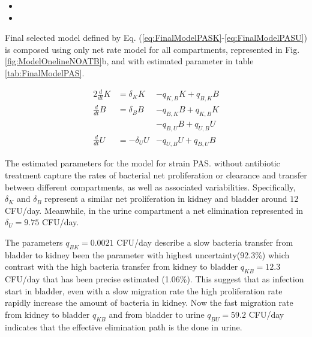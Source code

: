 \documentclass{article}
\begin{document}
\begin{itemize}
	\item {}
	\item {}
\end{itemize}

Final selected model defined by Eq. (\ref{eq:FinalModelPASK}-\ref{eq:FinalModelPASU}) is composed using only net rate model for all compartments, represented in Fig. \ref{fig:ModelOnelineNOATB}b, and with estimated parameter in table \ref{tab:FinalModelPAS}.

\begin{alignat}{2}
\frac{d}{dt} K &=  \delta_K K &- q_{K,B} K + q_{B,K} B \label{eq:FinalModelPASK} \\
\frac{d}{dt} B &=  \delta_B B &- q_{B,K} B + q_{K,B} K \nonumber\\
&              & -q_{B,U} B + q_{U,B} U \label{eq:FinalModelPASB} \\
\frac{d}{dt} U &= - \delta_U U &- q_{U,B} U + q_{B,U} B \label{eq:FinalModelPASU}
\end{alignat}


The estimated parameters for the model for strain PAS. without antibiotic treatment capture the rates of bacterial net proliferation or clearance and transfer between different compartments, as well as associated variabilities. Specifically, $\delta_{K}$ and $\delta_{B}$ represent a similar net proliferation in kidney and bladder around $12$ CFU/day. Meanwhile, in the urine compartment a net elimination represented in $\delta_{U}=9.75$ CFU/day.

The parameters $q_{BK}=0.0021$ CFU/day describe a slow bacteria transfer from bladder to kidney been the parameter with highest uncertainty(92.3\%) which contrast with the high bacteria transfer from kidney to bladder $q_{KB} = 12.3$ CFU/day that has been precise estimated (1.06\%). This suggest that as infection start in bladder, even with a slow migration rate the high proliferation rate rapidly increase the amount of bacteria in kidney. Now the fast migration rate from kidney to bladder $q_{KB}$ and from bladder to urine $q_{BU}=59.2$ CFU/day indicates that the effective elimination path is the done in urine.
\end{document}
